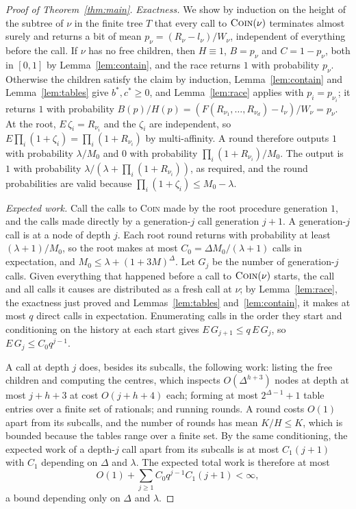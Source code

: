 \documentclass[11pt]{amsart}
\newcommand{\nsc}[1]{\textnormal{\textsc{#1}}}
\begin{document}
\begin{proof}[Proof of Theorem~\ref{thm:main}]
\emph{Exactness.} We show by induction on the height of the subtree of $\nu$ in the finite tree $T$ that every call to $\nsc{Coin}(\nu)$ terminates almost surely and returns a bit of mean $p_\nu=(R_\nu-l_\nu)/W_\nu$, independent of everything before the call. If $\nu$ has no free children, then $H\equiv1$, $B=p_\nu$ and $C=1-p_\nu$, both in $[0,1]$ by Lemma~\ref{lem:contain}, and the race returns $1$ with probability $p_\nu$. Otherwise the children satisfy the claim by induction, Lemma~\ref{lem:contain} and Lemma~\ref{lem:tables} give $b^*,c^*\ge0$, and Lemma~\ref{lem:race} applies with $p_i=p_{\nu_i}$; it returns $1$ with probability $B(p)/H(p)=(F(R_{\nu_1},\dots,R_{\nu_d})-l_\nu)/W_\nu=p_\nu$. At the root, $E\,\zeta_i=R_{\nu_i}$ and the $\zeta_i$ are independent, so $E\prod_i(1+\zeta_i)=\prod_i(1+R_{\nu_i})$ by multi-affinity. A round therefore outputs $1$ with probability $\lambda/M_0$ and $0$ with probability $\prod_i(1+R_{\nu_i})/M_0$. The output is $1$ with probability $\lambda/(\lambda+\prod_i(1+R_{\nu_i}))$, as required, and the round probabilities are valid because $\prod_i(1+\zeta_i)\le M_0-\lambda$.

\emph{Expected work.} Call the calls to \nsc{Coin} made by the root procedure generation $1$, and the calls made directly by a generation-$j$ call generation $j+1$. A generation-$j$ call is at a node of depth $j$. Each root round returns with probability at least $(\lambda+1)/M_0$, so the root makes at most $C_0=\Delta M_0/(\lambda+1)$ calls in expectation, and $M_0\le\lambda+(1+3M)^\Delta$. Let $G_j$ be the number of generation-$j$ calls. Given everything that happened before a call to $\nsc{Coin}(\nu)$ starts, the call and all calls it causes are distributed as a fresh call at $\nu$; by Lemma~\ref{lem:race}, the exactness just proved and Lemmas~\ref{lem:tables} and~\ref{lem:contain}, it makes at most $q$ direct calls in expectation. Enumerating calls in the order they start and conditioning on the history at each start gives $E\,G_{j+1}\le q\,E\,G_j$, so $E\,G_j\le C_0q^{j-1}$.

A call at depth $j$ does, besides its subcalls, the following work: listing the free children and computing the centres, which inspects $O(\Delta^{h+3})$ nodes at depth at most $j+h+3$ at cost $O(j+h+4)$ each; forming at most $2^{\Delta-1}+1$ table entries over a finite set of rationals; and running rounds. A round costs $O(1)$ apart from its subcalls, and the number of rounds has mean $K/H\le K$, which is bounded because the tables range over a finite set. By the same conditioning, the expected work of a depth-$j$ call apart from its subcalls is at most $C_1(j+1)$ with $C_1$ depending on $\Delta$ and $\lambda$. The expected total work is therefore at most
\[
O(1)+\sum_{j\ge1}C_0q^{j-1}C_1(j+1)<\infty,
\]
a bound depending only on $\Delta$ and $\lambda$.
\end{proof}
\end{document}
